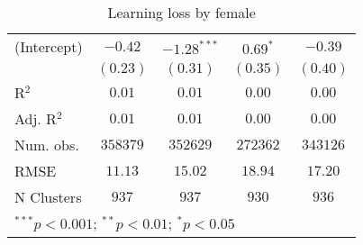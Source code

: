 \begin{table}
\begin{center}
\begin{tabular}{l c c c c}
(Intercept)               & $-0.42$       & $-1.28^{***}$ & $0.69^{*}$    & $-0.39$       \\
                          & $(0.23)$      & $(0.31)$      & $(0.35)$      & $(0.40)$      \\
\hline
R$^2$                     & $0.01$        & $0.01$        & $0.00$        & $0.00$        \\
Adj. R$^2$                & $0.01$        & $0.01$        & $0.00$        & $0.00$        \\
Num. obs.                 & $358379$      & $352629$      & $272362$      & $343126$      \\
RMSE                      & $11.13$       & $15.02$       & $18.94$       & $17.20$       \\
N Clusters                & $937$         & $937$         & $930$         & $936$         \\
\hline
\multicolumn{5}{l}{\scriptsize{$^{***}p<0.001$; $^{**}p<0.01$; $^{*}p<0.05$}}
\end{tabular}
\caption{Learning loss by female}
\label{tablefemale}
\end{center}
\end{table}
